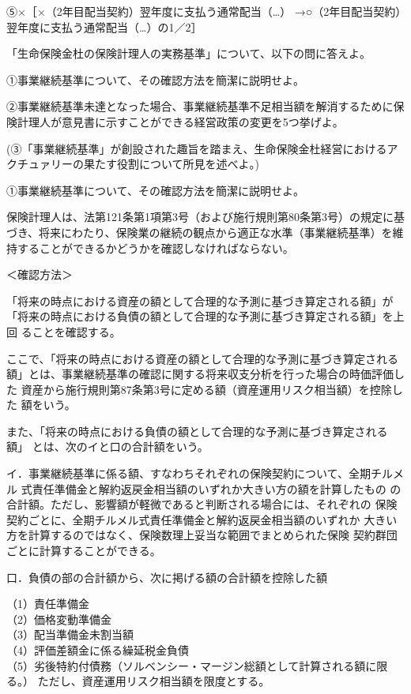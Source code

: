 \documentclass[report,gutter=10mm,fore-edge=10mm,uplatex,dvipdfmx]{jlreq}
\begin{document}
⑤×［×（2年目配当契約）翌年度に支払う通常配当（…）
→○（2年目配当契約）翌年度に支払う通常配当（…）の1／2］

「生命保険金杜の保険計理人の実務基準」について、以下の問に答えよ。

①事業継続基準について、その確認方法を簡潔に説明せよ。

②事業継続基準未達となった場合、事業継続基準不足相当額を解消するために保険計理人が意見書に示すことができる経営政策の変更を5つ挙げよ。

(③「事業継続基準」が創設された趣旨を踏まえ、生命保険金杜経営におけるアクチュァリーの果たす役割について所見を述べよ。)

\answer{}
①事業継続基準について、その確認方法を簡潔に説明せよ。

保険計理人は、法第121条第1項第3号（および施行規則第80条第3号）の規定に基づき、将来にわたり、保険業の継続の観点から適正な水準（事業継続基準）を維持することができるかどうかを確認しなければならない。

＜確認方法＞

「将来の時点における資産の額として合理的な予測に基づき算定される額」が
「将来の時点における負債の額として合理的な予測に基づき算定される額」を上回
ることを確認する。

ここで、「将来の時点における資産の額として合理的な予測に基づき算定される
額」とは、事業継続基準の確認に関する将来収支分析を行った場合の時価評価した
資産から施行規則第87条第3号に定める額（資産運用リスク相当額）を控除した
額をいう。

また、「将来の時点における負債の額として合理的な予測に基づき算定される額」
とは、次のイと口の合計額をいう。

イ．事業継続基準に係る額、すなわちそれぞれの保険契約について、全期チルメル
式責任準備金と解約返戻金相当額のいずれか大きい方の額を計算したもの
の合計額。ただし、影響額が軽微であると判断される場合には、それぞれの
保険契約ごとに、全期チルメル式責任準備金と解約返戻金相当額のいずれか
大きい方を計算するのではなく、保険数理上妥当な範囲でまとめられた保険
契約群団ごとに計算することができる。

口．負債の部の合計額から、次に掲げる額の合計額を控除した額

（1）責任準備金\\
（2）価格変動準備金\\
（3）配当準備金未割当額\\
（4）評価差額金に係る繰延税金負債\\
（5）劣後特約付債務（ソルベンシー・マージン総額として計算される額に限る。）
ただし、資産運用リスク相当額を限度とする。
\end{document}

